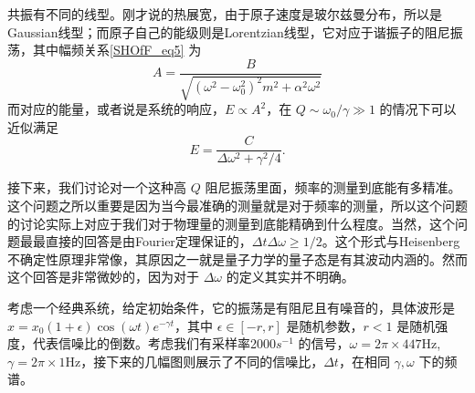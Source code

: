 共振有不同的线型。刚才说的热展宽，由于原子速度是玻尔兹曼分布，所以是Gaussian线型；而原子自己的能级则是Lorentzian线型，它对应于谐振子的阻尼振荡，其中幅频关系\autoref{SHOfF_eq5} 为
\begin{equation}
A = \frac{B}{\sqrt{(\omega^2 - \omega_0^2)^2 m^2 + \alpha^2\omega^2}}
\end{equation}
而对应的能量，或者说是系统的响应，$E\propto A^2$，在 $Q\sim\omega_0/\gamma\gg1$ 的情况下可以近似满足
\begin{equation}
E = \frac{C}{\Delta\omega^2 + \gamma^2/4}. 
\end{equation}

接下来，我们讨论对一个这种高 $Q$ 阻尼振荡里面，频率的测量到底能有多精准。这个问题之所以重要是因为当今最准确的测量就是对于频率的测量，所以这个问题的讨论实际上对应于我们对于物理量的测量到底能精确到什么程度。当然，这个问题最最直接的回答是由Fourier定理保证的，$\Delta t\Delta \omega\ge1/2$。这个形式与Heisenberg不确定性原理非常像，其原因之一就是量子力学的量子态是有其波动内涵的。然而这个回答是非常微妙的，因为对于 $\Delta\omega$ 的定义其实并不明确。

考虑一个经典系统，给定初始条件，它的振荡是有阻尼且有噪音的，具体波形是 $x=x_0(1+\epsilon)\cos(\omega t)e^{-\gamma t}$，其中 $\epsilon\in[-r,r]$ 是随机参数，$r<1$ 是随机强度，代表信噪比的倒数。考虑我们有采样率2000$s^{-1}$ 的信号，$\omega=2\pi\times447$Hz, $\gamma=2\pi\times1$Hz，接下来的几幅图则展示了不同的信噪比，$\Delta t$，在相同 $\gamma, \omega$ 下的频谱。
